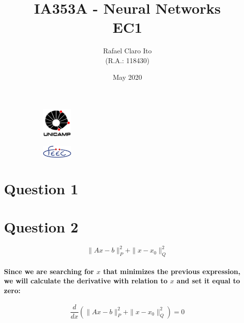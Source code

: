 \documentclass[a4paper]{article}    %
\begin{document}
\begin{figure}
    \centering
    \begin{subfigure}{0.45\textwidth}
        \centering
        \includegraphics[width=1.5cm]{unicamp}
    \end{subfigure}
    \hfill
    \begin{subfigure}{0.45\textwidth}
        \centering
        \includegraphics[width=1.5cm]{feec}
    \end{subfigure}
\end{figure}

\title{
    \vspace{5cm}
    IA353A - Neural Networks\\
    EC1
    \vspace{1cm}
}
\author{
    Rafael Claro Ito\\
    (R.A.: 118430)
    \vspace{11cm}
}
\date{May 2020}
\maketitle
\newpage

\section*{Question 1}

\newpage

\section*{Question 2}

\[\|Ax-b\|_{P}^{2}+\|x-x_{0}\|_{Q}^{2}\]
\paragraph{Since we are searching for $x$ that minimizes the previous expression, we will calculate the derivative with relation to $x$ and set it equal to zero:}
    \[\frac{d}{dx} (\|Ax-b\|_{P}^{2}+\|x-x_{0}\|_{Q}^{2}) = 0\]
\end{document}
